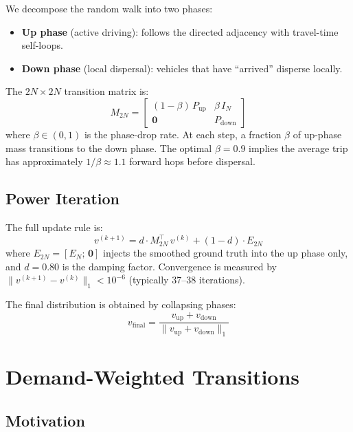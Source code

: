 \documentclass[11pt]{article}
\newcommand{\ETN}{E_{2N}}
\newcommand{\MTN}{M_{2N}}
\newcommand{\vfinal}{v_{\text{final}}}
\begin{document}
We decompose the random walk into two phases:
\begin{itemize}
    \item \textbf{Up phase} (active driving): follows the directed adjacency with travel-time self-loops.
    \item \textbf{Down phase} (local dispersal): vehicles that have ``arrived'' disperse locally.
\end{itemize}
The $2N \times 2N$ transition matrix is:
\begin{equation}
    \boxed{\MTN = \begin{bmatrix} (1-\beta)\,P_{\text{up}} & \beta\,I_N \\ \mathbf{0} & P_{\text{down}} \end{bmatrix}}
    \label{eq:block}
\end{equation}
where $\beta \in (0,1)$ is the phase-drop rate.
At each step, a fraction $\beta$ of up-phase mass transitions to the down phase.
The optimal $\beta = 0.9$ implies the average trip has approximately $1/\beta \approx 1.1$ forward hops before dispersal.

\subsection{Power Iteration}

The full update rule is:
\begin{equation}
    \boxed{v^{(k+1)} = d \cdot \MTN^\top \, v^{(k)} + (1-d) \cdot \ETN}
    \label{eq:power}
\end{equation}
where $\ETN = [E_N; \,\mathbf{0}]$ injects the smoothed ground truth into the up phase only, and $d = 0.80$ is the damping factor.
Convergence is measured by $\|v^{(k+1)} - v^{(k)}\|_1 < 10^{-6}$ (typically 37--38 iterations).

The final distribution is obtained by collapsing phases:
\begin{equation}
    \vfinal = \frac{v_{\text{up}} + v_{\text{down}}}{\|v_{\text{up}} + v_{\text{down}}\|_1}
\end{equation}


\section{Demand-Weighted Transitions}
\label{sec:demand}

\subsection{Motivation}
\label{sec:demand_motivation}
\end{document}
